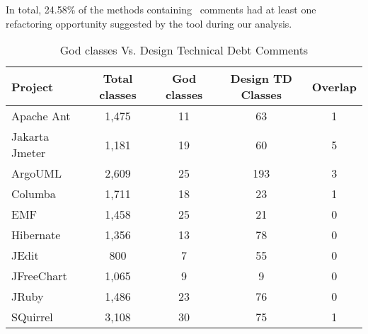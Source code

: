 
In total, 24.58\% of the methods containing \SADTD~comments had at least one refactoring opportunity suggested by the tool during our analysis.  


\begin{table*}[!hbt]
	\begin{center}
		\caption{God classes Vs. Design Technical Debt Comments}
		\vspace{-2mm}
		\label{tab:godclasscomparison}
		\begin{tabular}{l| c c c c} 
			\toprule
			\textbf{Project} & \textbf{Total classes} & \textbf{God classes} &  \textbf{Design TD Classes}  &  \textbf{Overlap}  \\ 
			\midrule
			Apache Ant & 1,475 & 11 & 63 & 1  \\ 
			Jakarta Jmeter & 1,181 & 19 & 60 & 5  \\
			ArgoUML & 2,609 & 25 & 193 & 3  \\
			Columba & 1,711 & 18 & 23 & 1  \\
			EMF & 1,458 & 25 & 21 & 0 \\
			Hibernate  & 1,356 & 13 & 78 & 0 \\
			JEdit & 800 & 7 & 55  & 0 \\
			JFreeChart & 1,065 & 9 & 9 & 0  \\
			JRuby & 1,486 & 23 & 76 & 0  \\
			SQuirrel  & 3,108 & 30 & 75 & 1 \\  
			\bottomrule
		\end{tabular}
	\end{center}
\end{table*}


